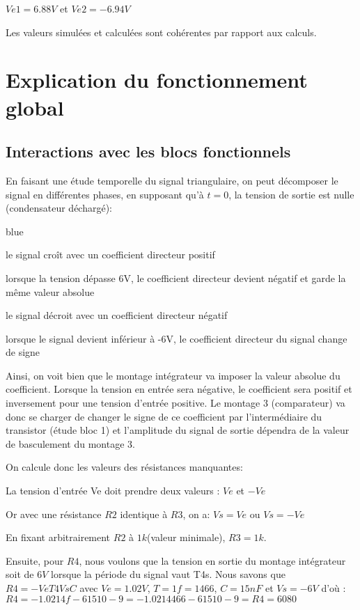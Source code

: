 {$Ve1=6.88V$   et  $Ve2=-6.94V$


Les valeurs simulées et calculées sont cohérentes par rapport aux calculs.\\

\section{Explication du fonctionnement global}

\subsection{Interactions avec les blocs fonctionnels}

En faisant une étude temporelle du signal triangulaire, on peut décomposer le signal en différentes phases, en supposant qu’à $t=0$, la tension de sortie est nulle 
(condensateur déchargé):

\begin{items}{blue}{\Bullet}
\item le signal croît avec un coefficient directeur  positif
\item lorsque la tension dépasse 6V, le coefficient directeur devient négatif et garde la même valeur absolue
\item le signal décroit avec un coefficient directeur   négatif
\item lorsque le signal devient inférieur à -6V, le coefficient directeur du signal change de signe
\end{items}
Ainsi, on voit bien que le montage intégrateur va imposer la valeur absolue du coefficient. Lorsque la tension en entrée sera négative, le coefficient sera positif et inversement pour une tension d’entrée positive.
Le montage 3 (comparateur) va donc se charger de changer le signe de ce coefficient par l’intermédiaire du transistor (étude bloc 1) et l’amplitude du signal de sortie dépendra de la valeur de basculement du montage 3.

On calcule donc les valeurs des résistances manquantes:


La tension d’entrée Ve doit prendre deux valeurs : $Ve$ et $-Ve$

Or avec une résistance $R2$ identique à $R3$, on a:
$Vs=Ve$ ou $Vs=-Ve$

En fixant arbitrairement $R2$ à $1k$(valeur minimale), $R3=1k$.

Ensuite, pour $R4$, nous voulons que la tension en sortie du montage intégrateur soit de $6V$ lorsque la période du signal vaut T4s.
Nous savons que $R4=-VeT4VsC$ avec $Ve = 1.02V$, $T = 1f=1466$, $C = 15 nF$ et $Vs = - 6V$
d'où : $R4=-1.0214f-61510-9=-1.0214466-61510-9 = R4=6080$

}
